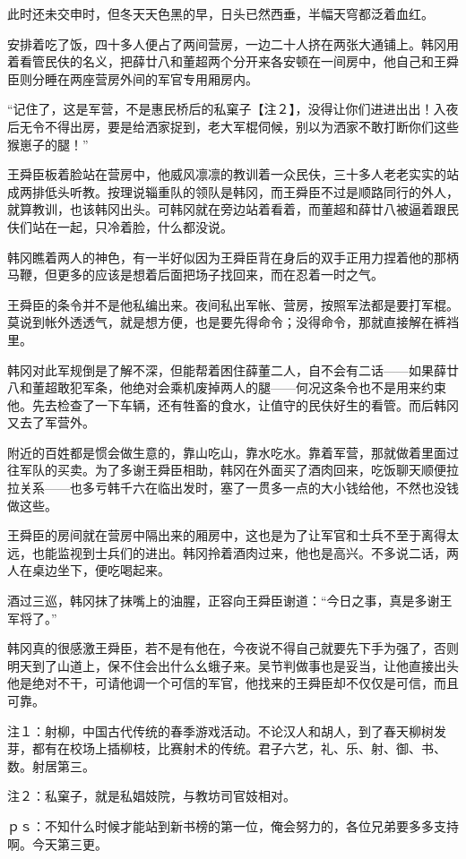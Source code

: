 此时还未交申时，但冬天天色黑的早，日头已然西垂，半幅天穹都泛着血红。

安排着吃了饭，四十多人便占了两间营房，一边二十人挤在两张大通铺上。韩冈用着看管民伕的名义，把薛廿八和董超两个分开来各安顿在一间房中，他自己和王舜臣则分睡在两座营房外间的军官专用厢房内。

“记住了，这是军营，不是惠民桥后的私窠子【注２】，没得让你们进进出出！入夜后无令不得出房，要是给洒家捉到，老大军棍伺候，别以为洒家不敢打断你们这些猴崽子的腿！”

王舜臣板着脸站在营房中，他威风凛凛的教训着一众民伕，三十多人老老实实的站成两排低头听教。按理说辎重队的领队是韩冈，而王舜臣不过是顺路同行的外人，就算教训，也该韩冈出头。可韩冈就在旁边站着看着，而董超和薛廿八被逼着跟民伕们站在一起，只冷着脸，什么都没说。

韩冈瞧着两人的神色，有一半好似因为王舜臣背在身后的双手正用力捏着他的那柄马鞭，但更多的应该是想着后面把场子找回来，而在忍着一时之气。

王舜臣的条令并不是他私编出来。夜间私出军帐、营房，按照军法都是要打军棍。莫说到帐外透透气，就是想方便，也是要先得命令；没得命令，那就直接解在裤裆里。

韩冈对此军规倒是了解不深，但能帮着困住薛董二人，自不会有二话——如果薛廿八和董超敢犯军条，他绝对会乘机废掉两人的腿——何况这条令也不是用来约束他。先去检查了一下车辆，还有牲畜的食水，让值守的民伕好生的看管。而后韩冈又去了军营外。

附近的百姓都是惯会做生意的，靠山吃山，靠水吃水。靠着军营，那就做着里面过往军队的买卖。为了多谢王舜臣相助，韩冈在外面买了酒肉回来，吃饭聊天顺便拉拉关系——也多亏韩千六在临出发时，塞了一贯多一点的大小钱给他，不然也没钱做这些。

王舜臣的房间就在营房中隔出来的厢房中，这也是为了让军官和士兵不至于离得太远，也能监视到士兵们的进出。韩冈拎着酒肉过来，他也是高兴。不多说二话，两人在桌边坐下，便吃喝起来。

酒过三巡，韩冈抹了抹嘴上的油腥，正容向王舜臣谢道：“今日之事，真是多谢王军将了。”

韩冈真的很感激王舜臣，若不是有他在，今夜说不得自己就要先下手为强了，否则明天到了山道上，保不住会出什么幺蛾子来。吴节判做事也是妥当，让他直接出头他是绝对不干，可请他调一个可信的军官，他找来的王舜臣却不仅仅是可信，而且可靠。

注１：射柳，中国古代传统的春季游戏活动。不论汉人和胡人，到了春天柳树发芽，都有在校场上插柳枝，比赛射术的传统。君子六艺，礼、乐、射、御、书、数。射居第三。

注２：私窠子，就是私娼妓院，与教坊司官妓相对。

ｐｓ：不知什么时候才能站到新书榜的第一位，俺会努力的，各位兄弟要多多支持啊。今天第三更。

